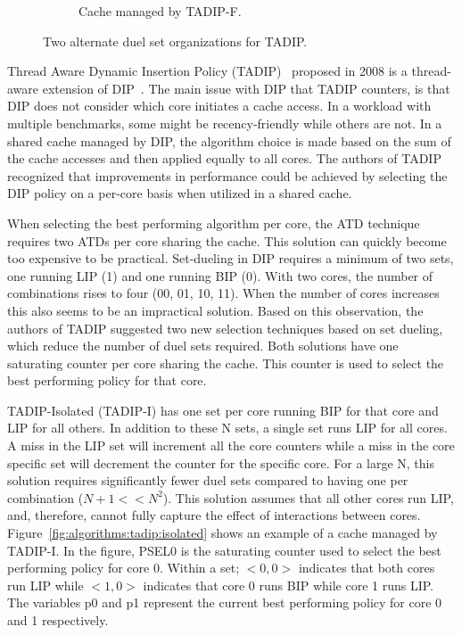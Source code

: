 \begin{figure}[H]
\begin{subfigure}[b]{0.45\textwidth}
        \caption{Cache managed by TADIP-F.}
        \label{fig:algorithms:tadip:feedback}
    \end{subfigure}    
    \caption{Two alternate duel set organizations for TADIP.}
    \label{fig:algorithms:tadip}
\end{figure}

Thread Aware Dynamic Insertion Policy (TADIP)~\cite{Jaleel2008} proposed in 2008 is a thread-aware extension of DIP~\cite{Qureshi2007}.
The main issue with DIP that TADIP counters, is that DIP does not consider which core initiates a cache access.
In a workload with multiple benchmarks, some might be recency-friendly while others are not. 
In a shared cache managed by DIP, the algorithm choice is made based on the sum of the cache accesses and then applied equally to all cores.
The authors of TADIP recognized that improvements in performance could be achieved by selecting the DIP policy on a per-core basis when utilized in a shared cache.

When selecting the best performing algorithm per core, the ATD technique requires two ATDs per core sharing the cache. 
This solution can quickly become too expensive to be practical.
Set-dueling in DIP requires a minimum of two sets, one running LIP (1) and one running BIP (0). 
With two cores, the number of combinations rises to four (00, 01, 10, 11).
When the number of cores increases this also seems to be an impractical solution.
Based on this observation, the authors of TADIP suggested two new selection techniques based on set dueling, which reduce the number of duel sets required.
Both solutions have one saturating counter per core sharing the cache.
This counter is used to select the best performing policy for that core.

TADIP-Isolated (TADIP-I) has one set per core running BIP for that core and LIP for all others.
In addition to these N sets, a single set runs LIP for all cores. 
A miss in the LIP set will increment all the core counters while a miss in the core specific set will decrement the counter for the specific core.
For a large N, this solution requires significantly fewer duel sets compared to having one per combination ($N+1 << N^2$). 
This solution assumes that all other cores run LIP, and, therefore, cannot fully capture the effect of interactions between cores.
Figure~\ref{fig:algorithms:tadip:isolated} shows an example of a cache managed by TADIP-I. 
In the figure, PSEL0 is the saturating counter used to select the best performing policy for core 0.
Within a set; $<0, 0>$ indicates that both cores run LIP while $<1, 0>$ indicates that core 0 runs BIP while core 1 runs LIP.
The variables p0 and p1 represent the current best performing policy for core 0 and 1 respectively.

